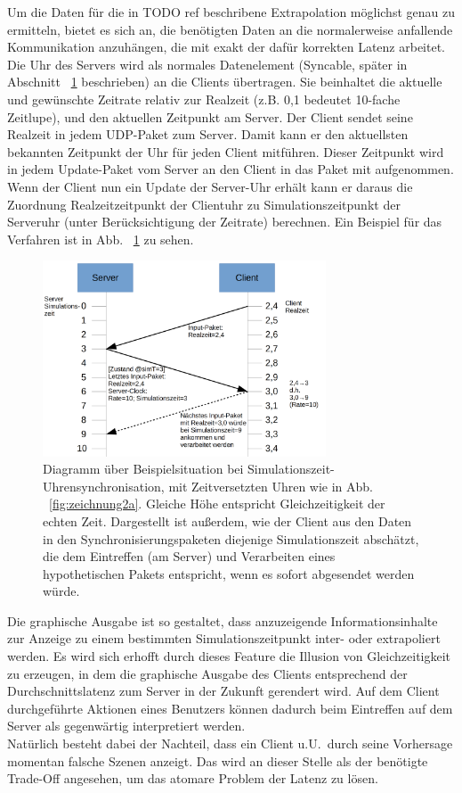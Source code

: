 Um die Daten für die in TODO ref beschribene Extrapolation möglichst genau zu ermitteln, bietet es sich an, die benötigten Daten an die normalerweise anfallende Kommunikation anzuhängen, die mit exakt der dafür korrekten Latenz arbeitet. Die Uhr des Servers wird als normales Datenelement (Syncable, später in Abschnitt ~\ref{fig:zeichnung3a} beschrieben) an die Clients übertragen. Sie beinhaltet die aktuelle und gewünschte Zeitrate relativ zur Realzeit (z.B. 0,1 bedeutet 10-fache Zeitlupe), und den aktuellen Zeitpunkt am Server. Der Client sendet seine Realzeit in jedem UDP-Paket zum Server. Damit kann er den aktuellsten bekannten Zeitpunkt der Uhr für jeden Client mitführen. Dieser Zeitpunkt wird in jedem Update-Paket vom Server an den Client in das Paket mit aufgenommen. Wenn der Client nun ein Update der Server-Uhr erhält kann er daraus die Zuordnung Realzeitzeitpunkt der Clientuhr zu Simulationszeitpunkt der Serveruhr (unter Berücksichtigung der Zeitrate) berechnen. Ein Beispiel für das Verfahren ist in Abb. ~\ref{fig:zeichnung3a} zu sehen.
\begin{figure}
    \centering
    \includegraphics[width=0.75\textwidth]{./Zeichnung3a.png}
    \caption{Diagramm über Beispielsituation bei Simulationszeit-Uhrensynchronisation, mit Zeitversetzten Uhren wie in Abb. ~\ref{fig:zeichnung2a}. Gleiche Höhe entspricht Gleichzeitigkeit der echten Zeit. Dargestellt ist außerdem, wie der Client aus den Daten in den Synchronisierungspaketen diejenige Simulationszeit abschätzt, die dem Eintreffen (am Server) und Verarbeiten eines hypothetischen Pakets entspricht, wenn es sofort abgesendet werden würde.}
    \label{fig:zeichnung3a}
\end{figure}




Die graphische Ausgabe ist so gestaltet, dass anzuzeigende Informationsinhalte zur Anzeige zu einem bestimmten Simulationszeitpunkt inter- oder extrapoliert werden.
Es wird sich erhofft durch dieses Feature die Illusion von Gleichzeitigkeit zu erzeugen, in dem die graphische Ausgabe des Clients entsprechend der Durchschnittslatenz zum Server in der Zukunft gerendert wird. Auf dem Client durchgeführte Aktionen eines Benutzers können dadurch beim Eintreffen auf dem Server als gegenwärtig interpretiert werden.\\
Natürlich besteht dabei der Nachteil, dass ein Client u.U.~durch seine Vorhersage momentan falsche Szenen anzeigt. Das wird an dieser Stelle als der benötigte Trade-Off angesehen, um das atomare Problem der Latenz zu lösen.

